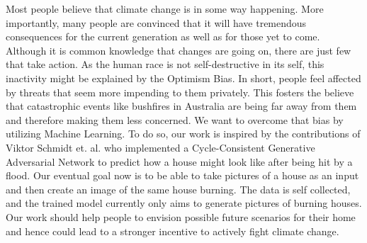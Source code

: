 Most people believe that climate change is in some way happening. More importantly, many people are convinced that it will have tremendous consequences for the current generation as well as for those yet to come. Although it is common knowledge that changes are going on, there are just few that take action. As the human race is not self-destructive in its self, this inactivity might be explained by the Optimism Bias. In short, people feel affected by threats that seem more impending to them privately. This fosters the believe that catastrophic events like bushfires in Australia are being far away from them and therefore making them less concerned. We want to overcome that bias by utilizing Machine Learning. To do so, our work is inspired by the contributions of Viktor Schmidt et. al. who implemented a Cycle-Consistent Generative Adversarial Network to predict how a house might look like after being hit by a flood. Our eventual goal now is to be able to take pictures of a house as an input and then create an image of the same house burning. The data is self collected, and the trained model currently only aims to generate pictures of burning houses. Our work should help people to envision possible future scenarios for their home and hence could lead to a stronger incentive to actively fight climate change.  